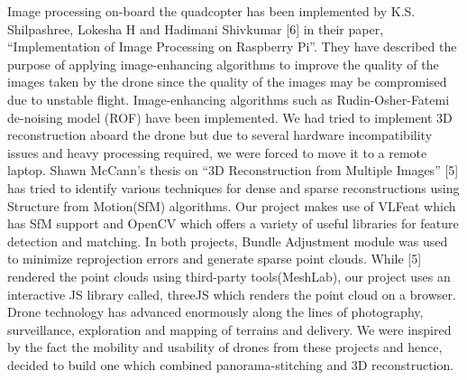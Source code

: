 Image processing on-board the quadcopter has been implemented by K.S. Shilpashree, Lokesha H and Hadimani Shivkumar [6] in their paper, “Implementation of Image Processing on Raspberry Pi”. They have described the purpose of applying image-enhancing algorithms to improve the quality of the images taken by the drone since the quality of the images may be compromised due to unstable flight. Image-enhancing algorithms such as Rudin-Osher-Fatemi de-noising model (ROF) have been implemented. 
We had tried to implement 3D reconstruction aboard the drone but due to several hardware incompatibility issues and heavy processing required, we were forced to move it to a remote laptop. Shawn McCann's thesis on “3D Reconstruction from Multiple Images” [5] has tried to identify various techniques for dense and sparse reconstructions using Structure from Motion(SfM) algorithms. Our project makes use of VLFeat which has SfM support and OpenCV which offers a variety of useful libraries for feature detection and matching. In both projects, Bundle Adjustment module was used to minimize reprojection errors and generate sparse point clouds. While [5] rendered the point clouds using third-party tools(MeshLab), our project uses an interactive JS library called, threeJS which renders the point cloud on a browser. Drone technology has advanced enormously along the lines of photography, surveillance, exploration and mapping of terrains and delivery. We were inspired by the fact the mobility and usability of drones from these projects and hence, decided to build one which combined panorama-stitching and 3D reconstruction.

